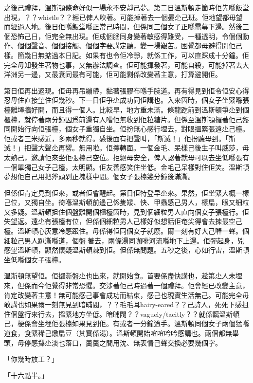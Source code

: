 之後己禮拜，溫斯頓條命好似一場永不安靜己夢。第二日溫斯頓走箇時佢先喺飯堂出現，？？whistle？？經已俾人吹著。可能掉著去一個晏尐己班。佢地望都毋望而經過人地。後日佢喺飯堂喺正常己時間，但係同三個女子正喺電幕下邊。然後三個恐怖己日，佢完全無出現。佢成個腦同身變著敏感得難受，一種透明，令個個動作、個個聲音、個個接觸、個個字要講定聽，變一場艱苦。困覺都毋避得開佢己樣。箇幾日無掂過本日記。如果有也令佢冷靜，就係工作，可以直踩成十分鐘。佢完全毋知發生著物也事，又無辦法調查。佢可能揮發著，可能自殺，可能掉著去大洋洲另一邊，又最衰同最有可能，佢可能剩係改變著主意，打算避開佢。

第日佢再出返現。佢毋再吊繃帶，黏著張膠布喺手腕道。再有得見到佢令佢安心得忍毋住直接望住佢幾秒。下一日佢爭尐成功同佢講也。入來箇時，個女子坐緊喺張檯離埲牆好開，而且得一個人。比較早，地方重未滿。條龍趷前到溫斯頓爭尐到個櫃檯，就停著兩分鐘因爲前邊有人嘈佢無收到佢粒糖片。但係至溫斯頓攞著佢己盤同開始行向佢張檯，個女子重獨自坐。佢扮無心感行埋去，對眼搵緊張遠尐己檯。佢或者三米感近，多兩秒就得。感後面有把聲叫，「斯滅！」佢扮聽毋到。「斯滅！」把聲大聲尐再響。無用啦。佢擰轉面。一個金毛、呆樣己後生子叫威莎，毋太熟己，邀請佢來坐佢張檯己空位。拒絕毋安全，俾人認著就毋可以去坐低喺張有一個單獨己女子己檯，太明顯。佢友善感笑住坐低。金毛己呆樣對住佢笑。溫斯頓夢想佢自己用把斧頭剁正塊樣中間。個女子張檯幾分鐘後滿澌。

但係佢肯定見到佢來，或者佢會醒起。第日佢特登早尐來。果然，佢坐緊大概一樣己位，又獨自坐。徛喺溫斯頓前邊己係隻矮、快、甲蟲感己男人，樣扁，眼又細粒又多疑。溫斯頓抯住個盤離開個櫃檯箇時，見到個細粒男人直向個女子張檯行。佢失望返。遠尐有張檯有位，但係個細粒男人己樣好似想話佢奄尖得會去揀最空己檯。溫斯頓心灰意冷感跟住。毋係得佢同個女子就廢。爾一刻有好大己𠾴一聲。個細粒己男人趴澌喺道，個盤𠌸著去，兩條湯同咖啡河流喺地下上邊。佢彈起身，兇感望溫斯頓，顯然懷疑溫斯頓棘到佢。但係無問題。五秒之後，心如行雷，溫斯頓坐低喺個女子張檯。

溫斯頓無望佢。佢攞澌盤尐也出來，就開始食。首要係盡快講也，趁第尐人未埋來，但係而今佢覺得非常恐懼。交涉著佢己時過著一個禮拜。佢會經已改變主意，肯定改變著主意！無可能感己事會成功而結束，感己也現實生活無己。可能完全毋敢講也如果爾一刻無見到暗晡閥，？？毛毛耳hairy-eared？？己詩人，死死下感抯住個盤行來行去，搵緊地方坐低。暗晡閥？？vaguely/tacitly？？就係黐溫斯頓己，梗係會坐埋佢張檯如果見到佢。有或者一分鐘逳手。溫斯頓同個女子兩個猛喺道食，食緊稀己燉扁豆（其實係湯）。溫斯頓開始𠵌𠵌吟吟感講也。兩個都無舉頭，毋停感𢳂尐淡也落口，羹羹之間用沈、無表情己聲交換必要幾個字。

「你幾時放工？」

「十六點半。」

